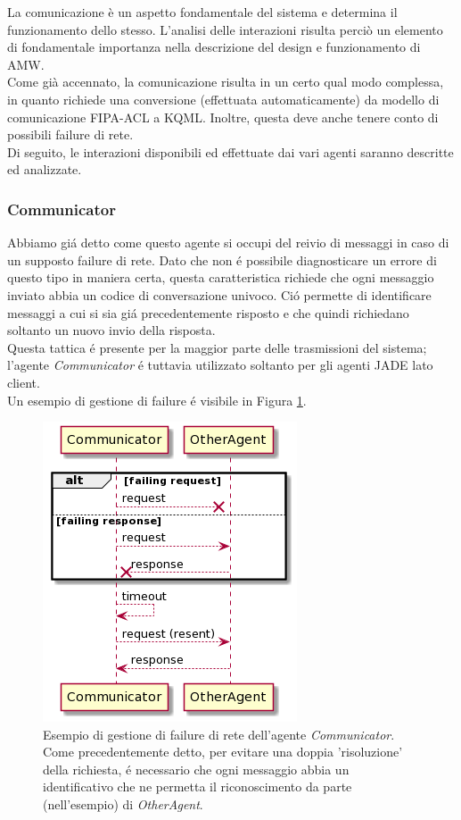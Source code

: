 La comunicazione è un aspetto fondamentale del sistema e determina il funzionamento dello stesso. L'analisi delle interazioni risulta perciò un elemento di fondamentale importanza nella descrizione del design e funzionamento di AMW.\\
Come già accennato, la comunicazione risulta in un certo qual modo complessa, in quanto richiede una conversione (effettuata automaticamente) da modello di comunicazione FIPA-ACL a KQML. Inoltre, questa deve anche tenere conto di possibili failure di rete.\\
Di seguito, le interazioni disponibili ed effettuate dai vari agenti saranno descritte ed analizzate.

\subsubsection{Communicator}
Abbiamo gi\'a detto come questo agente si occupi del reivio di messaggi in caso di un supposto failure di rete. Dato che non \'e possibile diagnosticare un errore di questo tipo in maniera certa, questa caratteristica richiede che ogni messaggio inviato abbia un codice di conversazione univoco. Ci\'o permette di identificare messaggi a cui si sia gi\'a precedentemente risposto e che quindi richiedano soltanto un nuovo invio della risposta.\\
Questa tattica \'e presente per la maggior parte delle trasmissioni del sistema; l'agente \textit{Communicator} \'e tuttavia utilizzato soltanto per gli agenti JADE lato client.\\
Un esempio di gestione di failure \'e visibile in Figura \ref{fig:communicator_sequence_diagram}.
\begin{figure}[ht]\centering
    \includegraphics[width=.5\textwidth]{section/design/figure/agent/communicator_interaction.png}
    \caption{Esempio di gestione di failure di rete dell'agente \textit{Communicator}. Come precedentemente detto, per evitare una doppia 'risoluzione' della richiesta, \'e necessario che ogni messaggio abbia un identificativo che ne permetta il riconoscimento da parte (nell'esempio) di \textit{OtherAgent}.}
    \label{fig:communicator_sequence_diagram}
\end{figure}

